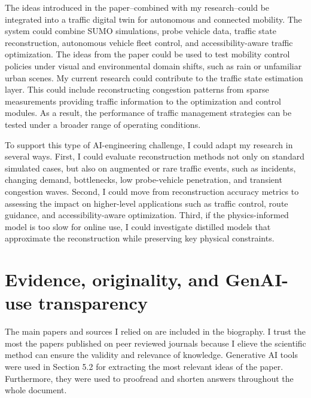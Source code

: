 \documentclass{article}
\begin{document}
The ideas introduced in the paper--combined with my research--could be integrated into a traffic digital twin for autonomous and connected mobility.
The system could combine SUMO simulations, probe vehicle data, traffic state reconstruction, autonomous vehicle fleet control, and accessibility-aware traffic optimization. 
The ideas from the paper could be used to test mobility control policies under visual and environmental domain shifts, such as rain or unfamiliar urban scenes. 
My current research could contribute to the traffic state estimation layer. 
This could include reconstructing congestion patterns from sparse measurements providing traffic information to the optimization and control modules. 
As a result, the performance of traffic management strategies can be tested under a broader range of operating conditions.

To support this type of AI-engineering challenge, I could adapt my research in several ways. 
First, I could evaluate reconstruction methods not only on standard simulated cases, but also on augmented or rare traffic events, such as incidents, changing demand, bottlenecks, low probe-vehicle penetration, and transient congestion waves. 
Second, I could move from reconstruction accuracy metrics to assessing the impact on higher-level applications such as traffic control, route guidance, and accessibility-aware optimization. 
Third, if the physics-informed model is too slow for online use, I could investigate distilled models that approximate the reconstruction while preserving key physical constraints.

\section{Evidence, originality, and GenAI-use transparency}
The main papers and sources I relied on are included in the biography. I trust the most the papers published on peer reviewed journals because I elieve the scientific method can ensure the validity and relevance of knowledge. 
Generative AI tools were used in Section 5.2 for extracting the most relevant ideas of the paper. 
Furthermore, they were used to proofread and shorten answers throughout the whole document. 

 
 
\end{document}
